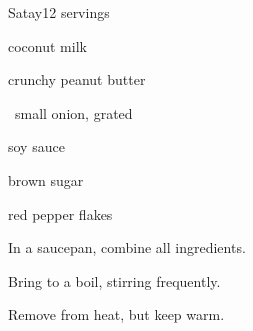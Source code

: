 \begin{recipe}{Satay}{}{12 servings}

\begin{ingredients}
\item {} coconut milk
\item \C{\half} crunchy peanut butter
\item \half{}~small onion, grated
\item {} soy sauce
\item {} brown sugar
\item \tp{\half} red pepper flakes
\end{ingredients}

\begin{directions}
\item In a saucepan, combine all ingredients.
\item Bring to a boil, stirring frequently.
\item Remove from heat, but keep warm.
\end{directions}

\end{recipe}
